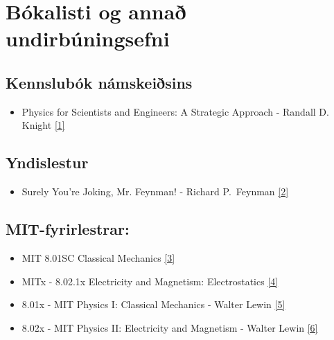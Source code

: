 \chapter*{Bókalisti og annað undirbúningsefni}

\section*{Kennslubók námskeiðsins}

\begin{itemize}
    \item Physics for Scientists and Engineers: A Strategic Approach - Randall D. Knight  \href{https://www.dropbox.com/s/pnba1mkmabj119s/randall-knight.pdf?dl=1}{[1]}
\end{itemize}

\section*{Yndislestur}

\begin{itemize}
    \item Surely You're Joking, Mr. Feynman! - Richard P.~Feynman \href{https://www.dropbox.com/s/yo37z252njf2myu/surely.pdf?dl=1}{[2]}
\end{itemize}


\section*{MIT-fyrirlestrar:}

\begin{itemize}

    \item MIT 8.01SC Classical Mechanics \href{https://youtube.com/playlist?list=PLUl4u3cNGP61qDex7XslwNJ-xxxEFzMNV}{[3]}
    
    \item MITx - 8.02.1x Electricity and Magnetism: Electrostatics \href{https://youtube.com/playlist?list=PLmNMkuCOhP2sGhvByEAq2LAS2QMFDPQM-}{[4]}
    
     \item 8.01x - MIT Physics I: Classical Mechanics - Walter Lewin \href{https://youtube.com/playlist?list=PLyQSN7X0ro203puVhQsmCj9qhlFQ-As8e}{[5]}
    
    \item 8.02x - MIT Physics II: Electricity and Magnetism - Walter Lewin \href{https://youtube.com/playlist?list=PLyQSN7X0ro2314mKyUiOILaOC2hk6Pc3j}{[6]}
    
\end{itemize}

